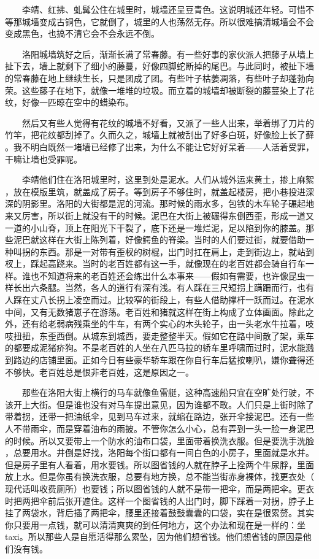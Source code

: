  　　李靖、红拂、虬髯公住在城里时，城墙还呈豆青色。这说明城还年轻。可惜不 等那城墙变成古铜色，它就倒了，城里的人也荡然无存。所以很难搞清城墙会不会 变成黑色，也搞不清它会不会永远不倒。

 　　洛阳城墙筑好之后，渐渐长满了常春藤。有一些好事的家伙派人把藤子从墙上 扯下去，墙上就剩下了细小的藤蔓，好像四脚蛇断掉的尾巴。与此同时，被扯下墙 的常春藤在地上继续生长，只是团成了团。有些叶子枯萎凋落，有些叶子却蓬勃向 荣。这些藤子在地下，就像一堆堆的垃圾。而立着的城墙却被断裂的藤蔓染上了花 纹，好像一匹晾在空中的蜡染布。

 　　然后又有些人觉得有花纹的城墙不好看，又派了一些人出来，举着绑了刀片的 竹竿，把花纹都刮掉了。久而久之，城墙上就被刮出了好多白斑，好像脸上长了藓 。我不明白既然一堵墙已经修了出来，为什么不能让它好好呆着——人活着受罪， 干嘛让墙也受罪呢。

 　　李靖他们住在洛阳城里时，这里到处是泥水。人们从城外运来黄土，掺上麻絮 ，放在模版里筑，就盖成了房子。等到房子不够住时，就盖起楼房，把小巷投进深 深的阴影里。洛阳的大街都是泥的河流。那时候的雨水多，包铁的木车轮子碾起地 来又厉害，所以街上就没有干的时候。泥巴在大街上被碾得东倒西歪，形成一道又 一道的小山脊，顶上在阳光下干裂了，底下还是一堆烂泥，足以陷到你的膝盖。那 些泥巴就这样在大街上陈列着，好像鳄鱼的脊梁。当时的人们要过街，就要借助一 种叫拐的东西。那是一对带有歪杈的树棍，出门时扛在肩上，走到街边上，就站到 杈上，踩起高跷来。当时的老百姓都有这一手，就像现在的老百姓都会骑自行车一 样。谁也不知道将来的老百姓还会练出什么本事来——假如有需要，也许像昆虫一 样长出六条腿。当然，各人的道行有深有浅。有人踩在三尺短拐上蹒跚而行，也有 人踩在丈八长拐上凌空而过。比较窄的街段上，有些人借助撑杆一跃而过。在泥水 中间，又有无数猪崽子在游荡。老百姓和猪就这样在街上构成了立体画面。除此之 外，还有给老弱病残乘坐的牛车，有两个实心的木头轮子，由一头老水牛拉着，吱 吱扭扭，东歪西倒。从城东到城西，要走整整半天。假如它在路中间散了架，乘车 的都要成泥猪疥狗。不是老百姓的人坐在八匹马拉的轿车里呼啸而过时，泥水能溅 到路边的店铺里面。正如今日有些豪华轿车跟在你自行车后猛按喇叭，嫌你聋得还 不够快。老百姓总是恨非老百姓，这是原因之一。

 　　那些在洛阳大街上横行的马车就像鱼雷艇，这种高速船只宜在空旷处行驶，不 该开上大街。但是谁也没有对马车提出意见，因为谁都不敢。人们只是上街时除了 带着拐，还带一把油纸伞，见到马车过来，就缩在路边，张开伞接泥巴。还有一些 人不带雨伞，而是穿着油布的雨披。不管你怎么小心，总有弄到一头一脸一身泥巴 的时候。所以又要带上一个防水的油布口袋，里面带着换洗衣服。但是要洗手洗脸 ，总要用水。井倒是好找，洛阳每个街口都有一间白色的小房子，里面就是水并。 但是房子里有人看着，用水要钱。所以图省钱的人就在脖子上拴两个牛尿脬，里面 放上水。但是你虽有换洗衣服，总要有地方换，总不能当街赤身裸体，找更衣处（ 现代话叫收费厕所）也要钱；所以图省钱的人就不是带一把伞，而是两把伞。更衣 时把两把伞前后张开遮住。这样一个图省钱的人出门时，脚下踩着一对拐，脖子上 挂了两袋水，背后插了两把伞，腰里还接着鼓鼓囊囊的口袋，实在是很累赘。其实 你只要用一点钱，就可以清清爽爽的到任何地方，这个办法和现在是一样的：坐 taxi。所以那些人是自愿活得那么累坠，因为他们想省钱。他们想省钱的原因是他们没有钱。 

